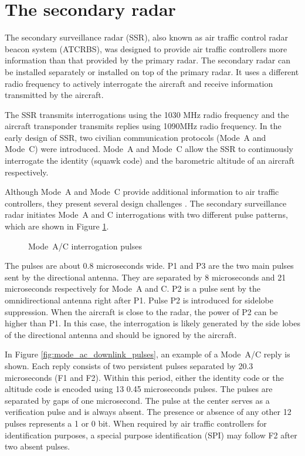 \section{The secondary radar}

The secondary surveillance radar (SSR), also known as air traffic control radar beacon system (ATCRBS), was designed to provide air traffic controllers more information than that provided by the primary radar. The secondary radar can be installed separately or installed on top of the primary radar. It uses a different radio frequency to actively interrogate the aircraft and receive information transmitted by the aircraft.

The SSR transmits interrogations using the 1030 MHz radio frequency and the aircraft transponder transmits replies using 1090MHz radio frequency. In the early design of SSR, two civilian communication protocols (Mode~A and Mode~C) were introduced. Mode~A and Mode~C allow the SSR to continuously interrogate the identity (squawk code) and the barometric altitude of an aircraft respectively.

Although Mode~A and Mode~C provide additional information to air traffic controllers, they present several design challenges \cite{icao1983}. The secondary surveillance radar initiates Mode~A and C interrogations with two different pulse patterns, which are shown in Figure \ref{fig:mode_ac_uplink_pulses}.

\begin{figure}[ht]
  \scalebox{0.9}{
    
  }
  \caption{Mode~A/C interrogation pulses}
  \label{fig:mode_ac_uplink_pulses}
\end{figure}

The pulses are about 0.8 microseconds wide. P1 and P3 are the two main pulses sent by the directional antenna. They are separated by 8 microseconds and 21 microseconds respectively for Mode~A and C. P2 is a pulse sent by the omnidirectional antenna right after P1. Pulse P2 is introduced for sidelobe suppression. When the aircraft is close to the radar, the power of P2 can be higher than P1. In this case, the interrogation is likely generated by the side lobes of the directional antenna and should be ignored by the aircraft.

In Figure \ref{fig:mode_ac_downlink_pulses}, an example of a Mode~A/C reply is shown. Each reply consists of two persistent pulses separated by 20.3 microseconds (F1 and F2). Within this period, either the identity code or the altitude code is encoded using 13 0.45 microseconds pulses. The pulses are separated by gaps of one microsecond. The pulse at the center serves as a verification pulse and is always absent. The presence or absence of any other 12 pulses represents a 1 or 0 bit. When required by air traffic controllers for identification purposes, a special purpose identification (SPI) may follow F2 after two absent pulses.

